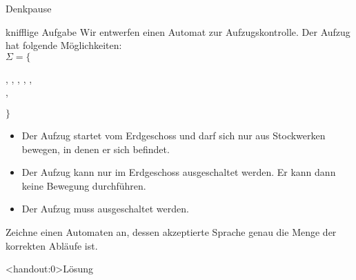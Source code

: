 {
\begin{frame}{Denkpause}
    \begin{small}
        \begin{alertblock}{knifflige Aufgabe}
            Wir entwerfen einen Automat zur Aufzugskontrolle.
            Der Aufzug hat folgende Möglichkeiten:\\
            $\Sigma =\{$\begin{footnotesize}
                 ,  ,  ,  ,  , \\\qquad\quad\; , 
            \end{footnotesize}$\}$
            \begin{itemize}
                \item Der Aufzug startet vom Erdgeschoss und darf sich nur aus Stockwerken bewegen, in denen er sich befindet.
                \item Der Aufzug kann nur im Erdgeschoss ausgeschaltet werden. Er kann dann keine Bewegung durchführen.
                \item Der Aufzug muss ausgeschaltet werden.
            \end{itemize}
        \end{alertblock}
        \alert{Zeichne einen Automaten an, dessen akzeptierte Sprache genau die Menge der korrekten Abläufe ist.}
    \end{small}
\end{frame}

\begin{frame}<handout:0>{Lösung}
    \begin{center}
\end{center}
\end{frame}}

